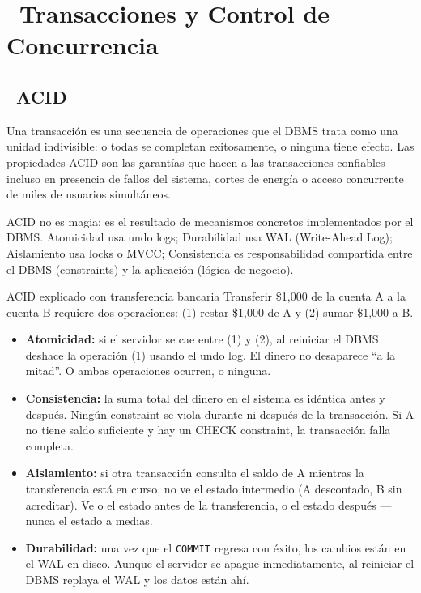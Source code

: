 \chapter[Transacciones y Control de Concurrencia]{~Transacciones y Control de Concurrencia}

\section[ACID]{~ACID}

Una transacción es una secuencia de operaciones que el DBMS trata como una unidad indivisible: o todas se completan exitosamente, o ninguna tiene efecto.
Las propiedades ACID son las garantías que hacen a las transacciones confiables incluso en presencia de fallos del sistema, cortes de energía o acceso concurrente de miles de usuarios simultáneos.

ACID no es magia: es el resultado de mecanismos concretos implementados por el DBMS.
Atomicidad usa undo logs; Durabilidad usa WAL (Write-Ahead Log); Aislamiento usa locks o MVCC; Consistencia es responsabilidad compartida entre el DBMS (constraints) y la aplicación (lógica de negocio).

\begin{teoriabox}{ACID explicado con transferencia bancaria}
Transferir \$1{,}000 de la cuenta A a la cuenta B requiere dos operaciones:
(1) restar \$1{,}000 de A y (2) sumar \$1{,}000 a B.

\begin{itemize}
  \item \textbf{Atomicidad:} si el servidor se cae entre (1) y (2), al reiniciar el DBMS deshace la operación (1) usando el undo log. El dinero no desaparece ``a la mitad''. O ambas operaciones ocurren, o ninguna.

  \item \textbf{Consistencia:} la suma total del dinero en el sistema es idéntica antes y después. Ningún constraint se viola durante ni después de la transacción. Si A no tiene saldo suficiente y hay un CHECK constraint, la transacción falla completa.

  \item \textbf{Aislamiento:} si otra transacción consulta el saldo de A mientras la transferencia está en curso, no ve el estado intermedio (A descontado, B sin acreditar). Ve o el estado antes de la transferencia, o el estado después — nunca el estado a medias.

  \item \textbf{Durabilidad:} una vez que el \texttt{COMMIT} regresa con éxito, los cambios están en el WAL en disco. Aunque el servidor se apague inmediatamente, al reiniciar el DBMS replaya el WAL y los datos están ahí.
\end{itemize}
\end{teoriabox}

